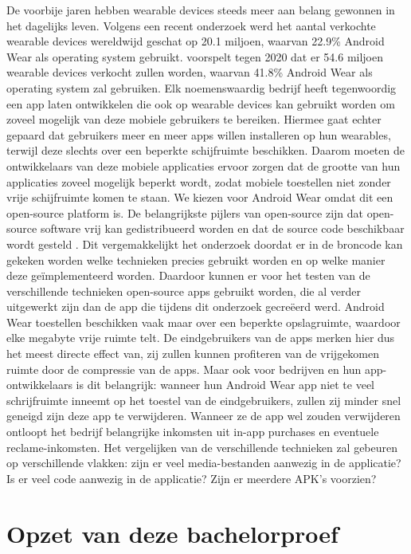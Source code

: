 De voorbije jaren hebben wearable devices steeds meer aan belang gewonnen in het dagelijks leven. Volgens een recent onderzoek werd het aantal verkochte wearable devices wereldwijd geschat op 20.1 miljoen, waarvan 22.9\% Android Wear als operating system gebruikt. \autocite{IDC} voorspelt tegen 2020 dat er 54.6 miljoen wearable devices verkocht zullen worden, waarvan 41.8\% Android Wear als operating system zal gebruiken. Elk noemenswaardig bedrijf heeft tegenwoordig een app laten ontwikkelen die ook op wearable devices kan gebruikt worden om zoveel mogelijk van deze mobiele gebruikers te bereiken. Hiermee gaat echter gepaard dat gebruikers meer en meer apps willen installeren op hun wearables, terwijl deze slechts over een beperkte schijfruimte beschikken. Daarom moeten de ontwikkelaars van deze mobiele applicaties ervoor zorgen dat de grootte van hun applicaties zoveel mogelijk beperkt wordt, zodat mobiele toestellen niet zonder vrije schijfruimte komen te staan. We kiezen voor Android Wear omdat dit een open-source platform is. De belangrijkste pijlers van open-source zijn dat open-source software vrij kan gedistribueerd worden en dat de source code beschikbaar wordt gesteld \autocite{OpenSourceInitiative}. Dit vergemakkelijkt het onderzoek doordat er in de broncode kan gekeken worden welke technieken precies gebruikt worden en op welke manier deze geïmplementeerd worden. Daardoor kunnen er voor het testen van de verschillende technieken open-source apps gebruikt worden, die al verder uitgewerkt zijn dan de app die tijdens dit onderzoek gecreëerd werd. Android Wear toestellen beschikken vaak maar over een beperkte opslagruimte, waardoor elke megabyte vrije ruimte telt. De eindgebruikers van de apps merken hier dus het meest directe effect van, zij zullen kunnen profiteren van de vrijgekomen ruimte door de compressie van de apps. Maar ook voor bedrijven en hun app-ontwikkelaars is dit belangrijk: wanneer hun Android Wear app niet te veel schrijfruimte inneemt op het toestel van de eindgebruikers, zullen zij minder snel geneigd zijn deze app te verwijderen. Wanneer ze de app wel zouden verwijderen ontloopt het bedrijf belangrijke inkomsten uit in-app purchases en eventuele reclame-inkomsten. Het vergelijken van de verschillende technieken zal gebeuren op verschillende vlakken: zijn er veel media-bestanden aanwezig in de applicatie? Is er veel code aanwezig in de applicatie? Zijn er meerdere APK's voorzien?

\section{Opzet van deze bachelorproef}
\label{sec:opzet-bachelorproef}

